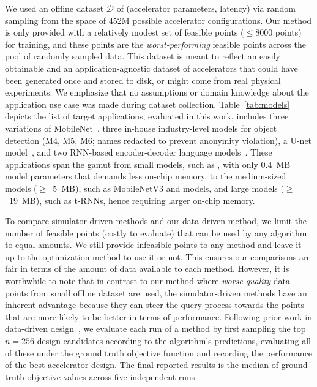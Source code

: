 %
We used an offline dataset $\mathcal{D}$ of (accelerator parameters, latency) via random sampling from the space of 452M possible accelerator configurations.
%
Our method is only provided with a relatively modest set of feasible points ($\leq 8000$ points) for training, and these points are the \emph{worst-performing} feasible points across the pool of randomly sampled data.
%
This dataset is meant to reflect an easily obtainable and an application-agnostic dataset of accelerators that could have been generated once and stored to disk, or might come from real physical experiments. 
%
We emphasize that no assumptions or domain knowledge about the application use case was made during dataset collection.
%
Table~\ref{tab:models} depicts the list of target applications, evaluated in this work, includes three variations of MobileNet~\citep{edgetpu:arxiv:2020,mnv2:arxiv:2018,mnv3:cvpr:2019}, three in-house industry-level models for object detection (M4, M5, M6; names redacted to prevent anonymity violation), a U-net model~\citep{unet}, and two RNN-based encoder-decoder language models~\citep{trnn01,trnn02,trnn03,trnn04}. 
%
These applications span the gamut from small models, such as \msix, with only 0.4~MB model parameters that demands less on-chip memory, to the medium-sized models ($\geq$~5~MB), such as MobileNetV3 and \mfour models, and large models ($\geq$~19~MB), such as t-RNNs, hence requiring larger on-chip memory. 
%


%
To compare simulator-driven methods and our data-driven method, we limit the number of feasible points (costly to evaluate) that can be used by any algorithm to equal amounts. We still provide infeasible points to any method and leave it up to the optimization method to use it or not.
This ensures our comparisons are fair in terms of the amount of data available to each method.
However, it is worthwhile to note that in contrast to our method where \emph{worse-quality} data points from small offline dataset are used, the simulator-driven methods have an inherent advantage because they can steer the query process towards the points that are more likely to be better in terms of performance.
Following prior work in data-driven design~\citep{brookes19a}, we evaluate each run of a method by first sampling the top $n=256$ design candidates according to the algorithm's predictions, evaluating all of these under the ground truth objective function and recording the performance of the best accelerator design. The final reported results is the median of ground truth objective values across five independent runs.
